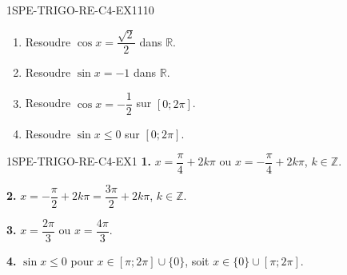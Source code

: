 

\begin{exercice}{1SPE-TRIGO-RE-C4-EX1}{1}{10}
\begin{enumerate}
  \item Resoudre $\cos x = \dfrac{\sqrt{2}}{2}$ dans $\mathbb{R}$.
  \item Resoudre $\sin x = -1$ dans $\mathbb{R}$.
  \item Resoudre $\cos x = -\dfrac{1}{2}$ sur $[0;2\pi]$.
  \item Resoudre $\sin x \leqslant 0$ sur $[0;2\pi]$.
\end{enumerate}
\end{exercice}


\begin{corrige}{1SPE-TRIGO-RE-C4-EX1}
\textbf{1.} $x = \dfrac{\pi}{4} + 2k\pi$ ou $x = -\dfrac{\pi}{4} + 2k\pi$, $k \in \mathbb{Z}$.

\textbf{2.} $x = -\dfrac{\pi}{2} + 2k\pi = \dfrac{3\pi}{2} + 2k\pi$, $k \in \mathbb{Z}$.

\textbf{3.} $x = \dfrac{2\pi}{3}$ ou $x = \dfrac{4\pi}{3}$.

\textbf{4.} $\sin x \leqslant 0$ pour $x \in [\pi;2\pi] \cup \{0\}$, soit $x \in \{0\} \cup [\pi;2\pi]$.
\end{corrige}
